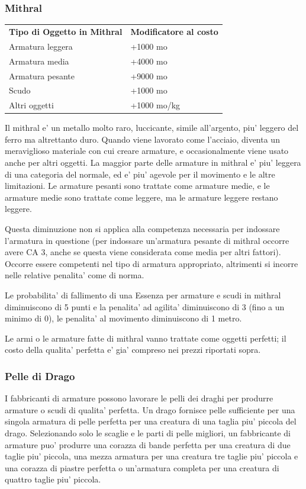 \documentclass[a4paper,11pt,twoside,openany]{book}
\begin{document}
{\subsubsection{Mithral}

\label{mithral}

\begin{tabular}{ll}
\toprule
\textbf{Tipo di Oggetto in Mithral} & \textbf{Modificatore al costo}\tabularnewline
Armatura leggera & +1000 mo\tabularnewline
Armatura media & +4000 mo\tabularnewline
Armatura pesante & +9000 mo\tabularnewline
Scudo & +1000 mo\tabularnewline
Altri oggetti & +1000 mo/kg\tabularnewline
\end{tabular}

\bigskip

Il mithral e' un metallo molto raro, luccicante, simile all'argento, piu' leggero del ferro ma altrettanto duro. Quando viene lavorato come l'acciaio, diventa un meraviglioso materiale con cui creare armature, e occasionalmente viene usato anche per altri oggetti. La maggior parte delle armature in mithral e' piu' leggera di una categoria del normale, ed e' piu' agevole per il movimento e le altre limitazioni. Le armature pesanti sono trattate come armature medie, e le armature medie sono trattate come leggere, ma le armature leggere restano leggere.

Questa diminuzione non si applica alla competenza necessaria per indossare l'armatura in questione (per indossare un'armatura pesante di mithral occorre avere CA 3, anche se questa viene considerata come media per altri fattori). Occorre essere competenti nel tipo di armatura appropriato, altrimenti si incorre nelle relative penalita' come di norma.

Le probabilita' di fallimento di una Essenza per armature e scudi in mithral diminuiscono di 5 punti e la penalita' ad agilita' diminuiscono di 3 (fino a un minimo di 0), le penalita' al movimento diminuiscono di 1 metro.

Le armi o le armature fatte di mithral vanno trattate come oggetti perfetti; il costo della qualita' perfetta e' gia' compreso nei prezzi riportati sopra.

\subsubsection{Pelle di Drago}

\label{pelle-di-drago}

I fabbricanti di armature possono lavorare le pelli dei draghi per produrre armature o scudi di qualita' perfetta.
Un drago fornisce pelle sufficiente per una singola armatura di pelle perfetta per una creatura di una taglia piu' piccola del drago. Selezionando solo le scaglie e le parti di pelle migliori, un fabbricante di armature puo' produrre una corazza di bande perfetta per una creatura di due taglie piu' piccola, una mezza armatura per una creatura tre taglie piu' piccola e una corazza di piastre perfetta o un'armatura completa per una creatura di quattro taglie piu' piccola. 

}
\end{document}
